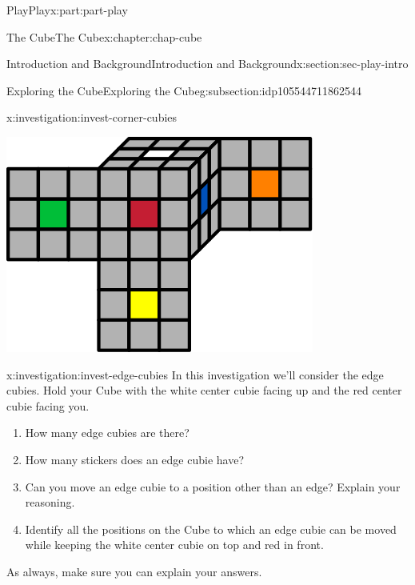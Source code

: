 \documentclass[oneside,10pt,]{book}
\numberwithin{equation}{section}
\begin{document}
\begin{partptx}{Play}{}{Play}{}{}{x:part:part-play}
\begin{chapterptx}{The Cube}{}{The Cube}{}{}{x:chapter:chap-cube}
\begin{sectionptx}{Introduction and Background}{}{Introduction and Background}{}{}{x:section:sec-play-intro}
\begin{subsectionptx}{Exploring the Cube}{}{Exploring the Cube}{}{}{g:subsection:idp105544711862544}
\begin{investigation}{}{x:investigation:invest-corner-cubies}
\begin{image}{0.25}{0.5}{0.25}
\includegraphics[width=\linewidth]{./images/moving_cubies.svg}
\end{image}%
\end{investigation}%
\begin{investigation}{}{x:investigation:invest-edge-cubies}%
In this investigation we'll consider the edge cubies. Hold your Cube with the white center cubie facing up and the red center cubie facing you.%
\begin{enumerate}
\item{}How many edge cubies are there?%
\item{}How many stickers does an edge cubie have?%
\item{}Can you move an edge cubie to a position other than an edge? Explain your reasoning.%
\item{}Identify all the positions on the Cube to which an edge cubie can be moved while keeping the white center cubie on top and red in front.%
\end{enumerate}
As always, make sure you can explain your answers.%
\begin{image}{0.25}{0.5}{0.25}%

\end{image}
\end{investigation}
\end{subsectionptx}
\end{sectionptx}
\end{chapterptx}
\end{partptx}
\end{document}
